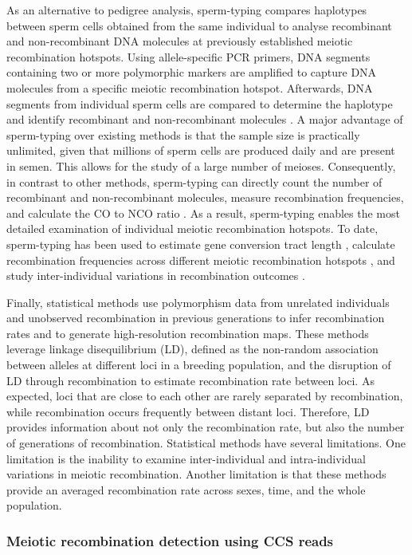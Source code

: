 As an alternative to pedigree analysis, sperm-typing compares haplotypes between sperm cells obtained from the same individual to analyse recombinant and non-recombinant DNA molecules at previously established meiotic recombination hotspots. Using allele-specific PCR primers, DNA segments containing two or more polymorphic markers are amplified to capture DNA molecules from a specific meiotic recombination hotspot. Afterwards, DNA segments from individual sperm cells are compared to determine the haplotype and identify recombinant and non-recombinant molecules \cite{}. A major advantage of sperm-typing over existing methods is that the sample size is practically unlimited, given that millions of sperm cells are produced daily and are present in semen. This allows for the study of a large number of meioses. Consequently, in contrast to other methods, sperm-typing can directly count the number of recombinant and non-recombinant molecules, measure recombination frequencies, and calculate the CO to NCO ratio \cite{}. As a result, sperm-typing enables the most detailed examination of individual meiotic recombination hotspots. To date, sperm-typing has been used to estimate gene conversion tract length \cite{}, calculate recombination frequencies across different meiotic recombination hotspots \cite{}, and study inter-individual variations in recombination outcomes \cite{}. 

Finally, statistical methods use polymorphism data from unrelated individuals and unobserved recombination in previous generations to infer recombination rates and to generate high-resolution recombination maps. These methods leverage linkage disequilibrium (LD), defined as the non-random association between alleles at different loci in a breeding population, and the disruption of LD through recombination to estimate recombination rate between loci. As expected, loci that are close to each other are rarely separated by recombination, while recombination occurs frequently between distant loci.  Therefore, LD provides information about not only the recombination rate, but also the number of generations of recombination. Statistical methods have several limitations. One limitation is the inability to examine inter-individual and intra-individual variations in meiotic recombination. Another limitation is that these methods provide an averaged recombination rate across sexes, time, and the whole population. 

\subsubsection{Meiotic recombination detection using CCS reads}


